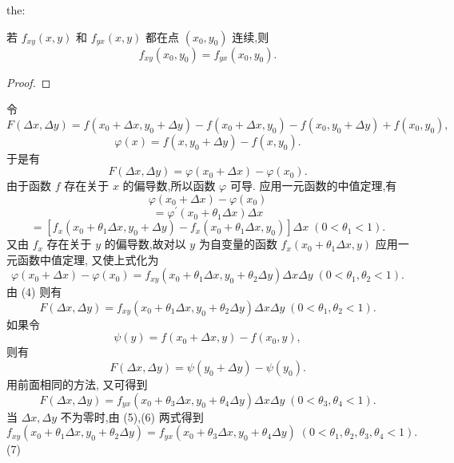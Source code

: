 \begin{theorem}{}{the:}

\end{theorem}
 若 \({f}_{xy}\left( {x,y}\right)\) 和 \({f}_{yx}\left( {x,y}\right)\) 都在点 \(\left( {{x}_{0},{y}_{0}}\right)\) 连续,则
\[
{f}_{xy}\left( {{x}_{0},{y}_{0}}\right)  = {f}_{yx}\left( {{x}_{0},{y}_{0}}\right) . \tag{3}
\]
\begin{proof}

\end{proof}
令
\[
F\left( {{\Delta x},{\Delta y}}\right)  = f\left( {{x}_{0} + {\Delta x},{y}_{0} + {\Delta y}}\right)  - f\left( {{x}_{0} + {\Delta x},{y}_{0}}\right)  - f\left( {{x}_{0},{y}_{0} + {\Delta y}}\right)  + f\left( {{x}_{0},{y}_{0}}\right) ,
\]
\[
\varphi \left( x\right)  = f\left( {x,{y}_{0} + {\Delta y}}\right)  - f\left( {x,{y}_{0}}\right) .
\]
于是有
\[
F\left( {{\Delta x},{\Delta y}}\right)  = \varphi \left( {{x}_{0} + {\Delta x}}\right)  - \varphi \left( {x}_{0}\right) . \tag{4}
\]
由于函数 \(f\) 存在关于 \(x\) 的偏导数,所以函数 \(\varphi\) 可导. 应用一元函数的中值定理,有
\[
\varphi \left( {{x}_{0} + {\Delta x}}\right)  - \varphi \left( {x}_{0}\right)
\]
\[
= {\varphi }^{\prime }\left( {{x}_{0} + {\theta }_{1}{\Delta x}}\right) {\Delta x}
\]
\[
= \left\lbrack  {{f}_{x}\left( {{x}_{0} + {\theta }_{1}{\Delta x},{y}_{0} + {\Delta y}}\right)  - {f}_{x}\left( {{x}_{0} + {\theta }_{1}{\Delta x},{y}_{0}}\right) }\right\rbrack  {\Delta x}\;\left( {0 < {\theta }_{1} < 1}\right) .
\]
又由 \({f}_{x}\) 存在关于 \(y\) 的偏导数,故对以 \(y\) 为自变量的函数 \({f}_{x}\left( {{x}_{0} + {\theta }_{1}{\Delta x},y}\right)\) 应用一元函数中值定理, 又使上式化为
\[
\varphi \left( {{x}_{0} + {\Delta x}}\right)  - \varphi \left( {x}_{0}\right)  = {f}_{xy}\left( {{x}_{0} + {\theta }_{1}{\Delta x},{y}_{0} + {\theta }_{2}{\Delta y}}\right) {\Delta x\Delta y}\;\left( {0 < {\theta }_{1},{\theta }_{2} < 1}\right) .
\]
由 (4) 则有
\[
F\left( {{\Delta x},{\Delta y}}\right)  = {f}_{xy}\left( {{x}_{0} + {\theta }_{1}{\Delta x},{y}_{0} + {\theta }_{2}{\Delta y}}\right) {\Delta x\Delta y}\;\left( {0 < {\theta }_{1},{\theta }_{2} < 1}\right) . \tag{5}
\]
如果令
\[
\psi \left( y\right)  = f\left( {{x}_{0} + {\Delta x},y}\right)  - f\left( {{x}_{0},y}\right) ,
\]
则有
\[
F\left( {{\Delta x},{\Delta y}}\right)  = \psi \left( {{y}_{0} + {\Delta y}}\right)  - \psi \left( {y}_{0}\right) .
\]
用前面相同的方法, 又可得到
\[
F\left( {{\Delta x},{\Delta y}}\right)  = {f}_{yx}\left( {{x}_{0} + {\theta }_{3}{\Delta x},{y}_{0} + {\theta }_{4}{\Delta y}}\right) {\Delta x\Delta y}\;\left( {0 < {\theta }_{3},{\theta }_{4} < 1}\right) . \tag{6}
\]
当 \({\Delta x},{\Delta y}\) 不为零时,由 (5),(6) 两式得到
\[
{f}_{xy}\left( {{x}_{0} + {\theta }_{1}{\Delta x},{y}_{0} + {\theta }_{2}{\Delta y}}\right)  = {f}_{yx}\left( {{x}_{0} + {\theta }_{3}{\Delta x},{y}_{0} + {\theta }_{4}{\Delta y}}\right) \;\left( {0 < {\theta }_{1},{\theta }_{2},{\theta }_{3},{\theta }_{4} < 1}\right) .
\]
(7)

